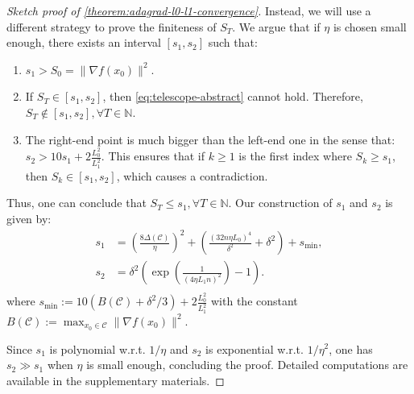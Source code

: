 \documentclass{article}
\theoremstyle{plain}
\theoremstyle{definition}
\theoremstyle{remark}
\newcommand*{\cC}{\mathcal{C}}
\newcommand*{\NN}{\mathbb{N}}
\begin{document}
\begin{proof}[Sketch proof of \cref{theorem:adagrad-l0-l1-convergence}]
    Instead, we will use a different strategy to prove the finiteness of $S_T$. We argue that if $\eta$ is chosen small enough, there exists an interval $[s_1, s_2]$ such that:
    \begin{enumerate}[leftmargin=*]
        \item $s_1 > S_0 = \|\nabla f(x_0)\|^2$.
        \item If $S_T \in [s_1, s_2]$, then \eqref{eq:telescope-abstract} cannot hold. Therefore, $S_T \notin [s_1, s_2], \forall T \in \NN$.
        \item The right-end point is much bigger than the left-end one in the sense that: $s_2 > 10s_1 + 2\frac{L_0^2}{L_1^2}$. This ensures that if $k \geq 1$ is the first index where $S_{k} \geq s_1$, then $S_k \in [s_1, s_2]$, which causes a contradiction.
    \end{enumerate}
    Thus, one can conclude that $S_T \leq s_1, \forall T \in \NN$. Our construction of $s_1$ and $s_2$ is given by:
    \begin{equation}
        \label{eq:s1-s2-construction}
        \begin{aligned}
            s_1 &= \left(\frac{8 \Delta(\mathcal{C})}{\eta}\right)^2 + \left(\frac{(32n\eta L_0)^4}{\delta^2} + \delta^2\right) + s_{\min},\\
            s_2 &= \delta^2 \left(\exp\left(\frac{1}{(4\eta L_1 n)^2}\right) - 1\right).\\
        \end{aligned}
    \end{equation}
    where $s_{\min}:= 10(B(\cC)+ \delta^2 / 3) + 2\frac{L_0^2}{L_1^2}$
    with the constant $B(\cC):= \max_{x_0 \in \mathcal{C}} \|\nabla f(x_0)\|^2$. 
    
    Since $s_1$ is polynomial w.r.t. $1/\eta$ and $s_2$ is exponential w.r.t. $1/\eta^2$, one has $s_2 \gg s_1$ when $\eta$ is small enough, concluding the proof.
    Detailed computations are available in the supplementary materials.
\end{proof} 
\end{document}
